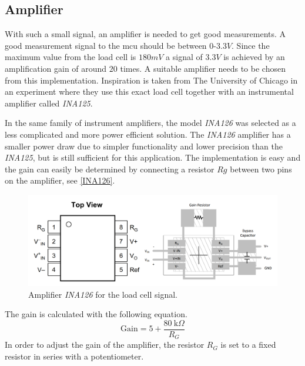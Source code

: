 \subsection{Amplifier}
With such a small signal, an amplifier is needed to get good measurements. A good measurement signal to the \gls{mcu} should be between $0$-$3.3V$. Since the maximum value from the load cell is $180mV$ a signal of $3.3V$ is achieved by an amplification gain of around $20$ times.  
A suitable amplifier needs to be chosen from this implementation. Inspiration is taken from The University of Chicago\cite{UoC} in an experiment where they use this exact load cell together with an instrumental amplifier called \emph{INA125}. %

In the same family of instrument amplifiers, the model \emph{INA126} was selected as a less complicated and more power efficient solution.  
The \emph{INA126} amplifier has a smaller power draw due to simpler functionality and lower precision than the \emph{INA125}, but is still sufficient for this application.  
The implementation is easy and the gain can easily be determined by connecting a resistor $Rg$ between two pins on the amplifier, see \autoref{INA126}.

\begin{figure}[H]
\begin{center}
	\includegraphics[width = .8\textwidth]{Figures/INA126_pinout.png}
	\caption{Amplifier \emph{INA126} for the load cell signal.}
	\label{INA126}
\end{center}
\end{figure}

\noindent The gain is calculated with the following equation.  
\begin{equation}
\textrm{Gain} = 5 + \frac{80~\textrm{k}\Omega}{R_G}
\end{equation}
In order to adjust the gain of the amplifier, the resistor $R_G$ is set to a fixed resistor in series with a potentiometer.


